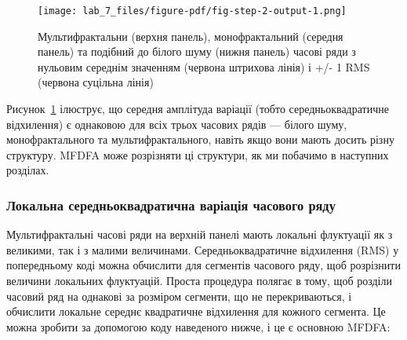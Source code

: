\documentclass[
  letterpaper,
]{report}
\begin{document}
\begin{figure}[H]

{\centering \texttt{[image: lab\_7\_files/figure-pdf/fig-step-2-output-1.png]}

}

\caption{\label{fig-step-2}Мультифрактальни (верхня панель),
монофрактальний (середня панель) та подібний до білого шуму (нижня
панель) часові ряди з нульовим середнім значенням (червона штрихова
лінія) і +/- 1 RMS (червона суцільна лінія)}

\end{figure}

Рисунок~\ref{fig-step-2} ілюструє, що середня амплітуда варіації (тобто
середньоквадратичне відхилення) є однаковою для всіх трьох часових рядів
--- білого шуму, монофрактального та мультифрактального, навіть якщо
вони мають досить різну структуру. MFDFA може розрізняти ці структури,
як ми побачимо в наступних розділах.

\hypertarget{ux43bux43eux43aux430ux43bux44cux43dux430-ux441ux435ux440ux435ux434ux43dux44cux43eux43aux432ux430ux434ux440ux430ux442ux438ux447ux43dux430-ux432ux430ux440ux456ux430ux446ux456ux44f-ux447ux430ux441ux43eux432ux43eux433ux43e-ux440ux44fux434ux443}{%
\subsubsection{Локальна середньоквадратична варіація часового
ряду}\label{ux43bux43eux43aux430ux43bux44cux43dux430-ux441ux435ux440ux435ux434ux43dux44cux43eux43aux432ux430ux434ux440ux430ux442ux438ux447ux43dux430-ux432ux430ux440ux456ux430ux446ux456ux44f-ux447ux430ux441ux43eux432ux43eux433ux43e-ux440ux44fux434ux443}}

Мультифрактальні часові ряди на верхній панелі мають локальні флуктуації
як з великими, так і з малими величинами. Середньоквадратичне відхилення
(RMS) у попередньому коді можна обчислити для сегментів часового ряду,
щоб розрізнити величини локальних флуктуацій. Проста процедура полягає в
тому, щоб розділи часовий ряд на однакові за розміром сегменти, що не
перекриваються, і обчислити локальне середнє квадратичне відхилення для
кожного сегмента. Це можна зробити за допомогою коду наведеного нижче, і
це є основною MFDFA:
\end{document}
